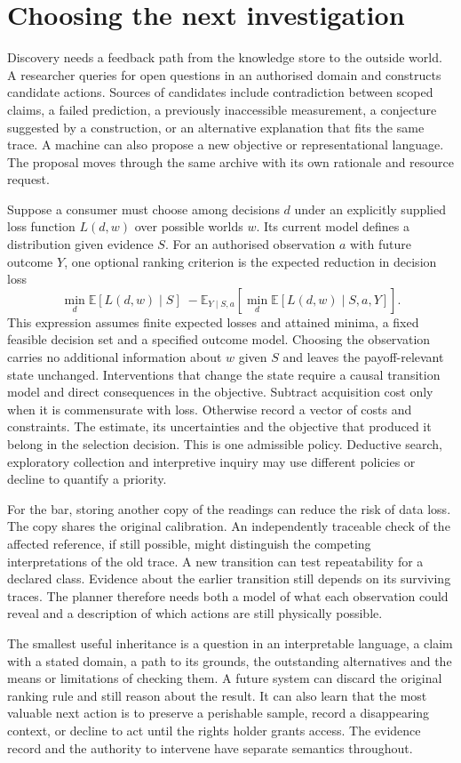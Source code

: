 \documentclass[11pt,a4paper]{article}
\newcommand{\partpage}[1]{\clearpage\section{#1}}
\newcommand{\topic}[1]{\par\smallskip{\sffamily\bfseries\color{ink}#1\par}\nobreak}
\begin{document}
\partpage{Choosing the next investigation}\label{app:planning}
Discovery needs a feedback path from the knowledge store to the outside world. A researcher queries for open questions in an authorised domain and constructs candidate actions. Sources of candidates include contradiction between scoped claims, a failed prediction, a previously inaccessible measurement, a conjecture suggested by a construction, or an alternative explanation that fits the same trace. A machine can also propose a new objective or representational language. The proposal moves through the same archive with its own rationale and resource request.

\topic{Planning under uncertainty}
Suppose a consumer must choose among decisions $d$ under an explicitly supplied loss function $L(d,w)$ over possible worlds $w$. Its current model defines a distribution given evidence $S$. For an authorised observation $a$ with future outcome $Y$, one optional ranking criterion is the expected reduction in decision loss
\[
\min_d \mathbb{E}[L(d,w)\mid S]\;-
\mathbb{E}_{Y\mid S,a}\!\left[\min_d \mathbb{E}[L(d,w)\mid S,a,Y]\right].
\]
This expression assumes finite expected losses and attained minima, a fixed feasible decision set and a specified outcome model. Choosing the observation carries no additional information about $w$ given $S$ and leaves the payoff-relevant state unchanged. Interventions that change the state require a causal transition model and direct consequences in the objective. Subtract acquisition cost only when it is commensurate with loss. Otherwise record a vector of costs and constraints. The estimate, its uncertainties and the objective that produced it belong in the selection decision. This is one admissible policy. Deductive search, exploratory collection and interpretive inquiry may use different policies or decline to quantify a priority.

For the bar, storing another copy of the readings can reduce the risk of data loss. The copy shares the original calibration. An independently traceable check of the affected reference, if still possible, might distinguish the competing interpretations of the old trace. A new transition can test repeatability for a declared class. Evidence about the earlier transition still depends on its surviving traces. The planner therefore needs both a model of what each observation could reveal and a description of which actions are still physically possible.

\topic{What a successor needs to recover}
The smallest useful inheritance is a question in an interpretable language, a claim with a stated domain, a path to its grounds, the outstanding alternatives and the means or limitations of checking them. A future system can discard the original ranking rule and still reason about the result. It can also learn that the most valuable next action is to preserve a perishable sample, record a disappearing context, or decline to act until the rights holder grants access. The evidence record and the authority to intervene have separate semantics throughout.
\end{document}
